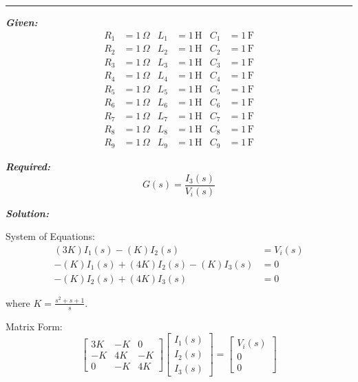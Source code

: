 \documentclass[11pt]{article}
\begin{document}

\noindent\rule{\textwidth}{1pt}

\vspace{12pt}

\noindent\textbf{\textit{Given:}}
\[
\begin{aligned}
R_1 &= 1\, \Omega & L_1 &= 1\, \text{H} & C_1 &= 1\, \text{F} \\
R_2 &= 1\, \Omega & L_2 &= 1\, \text{H} & C_2 &= 1\, \text{F} \\
R_3 &= 1\, \Omega & L_3 &= 1\, \text{H} & C_3 &= 1\, \text{F} \\
R_4 &= 1\, \Omega & L_4 &= 1\, \text{H} & C_4 &= 1\, \text{F} \\
R_5 &= 1\, \Omega & L_5 &= 1\, \text{H} & C_5 &= 1\, \text{F} \\
R_6 &= 1\, \Omega & L_6 &= 1\, \text{H} & C_6 &= 1\, \text{F} \\
R_7 &= 1\, \Omega & L_7 &= 1\, \text{H} & C_7 &= 1\, \text{F} \\
R_8 &= 1\, \Omega & L_8 &= 1\, \text{H} & C_8 &= 1\, \text{F} \\
R_9 &= 1\, \Omega & L_9 &= 1\, \text{H} & C_9 &= 1\, \text{F}
\end{aligned}
\]

\vspace{12pt}

\noindent \textbf{\textit{Required:}}
\[
G(s) = \frac{I_3(s)}{V_i(s)}
\]

\vspace{12pt}

\noindent \textbf{\textit{Solution:}}

\bigskip

{System of Equations:}
\[
\begin{aligned}
(3K)I_1(s) - (K)I_2(s) &= V_i(s) \\
-(K)I_1(s) + (4K)I_2(s) - (K)I_3(s) &= 0 \\
-(K)I_2(s) + (4K)I_3(s) &= 0
\end{aligned}
\]

{where $K = \frac{s^2 + s + 1}{s}$.}

{Matrix Form:}
\[
\begin{bmatrix}
3K & -K & 0 \\
-K & 4K & -K \\
0 & -K & 4K
\end{bmatrix}
\begin{bmatrix}
I_1(s) \\ I_2(s) \\ I_3(s)
\end{bmatrix}
=
\begin{bmatrix}
V_i(s) \\ 0 \\ 0
\end{bmatrix}
\]
\end{document}
